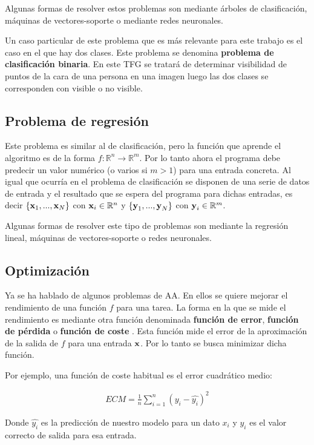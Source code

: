 Algunas formas de resolver estos problemas son mediante árboles de clasificación, máquinas de vectores-soporte o mediante redes neuronales.

Un caso particular de este problema que es más relevante para este trabajo es el caso en el que hay dos clases. Este problema se denomina \textbf{problema de clasificación binaria}. En este TFG se tratará de determinar visibilidad de puntos de la cara de una persona en una imagen luego las dos clases se corresponden con visible o no visible.

\subsection{Problema de regresión}
Este problema es similar al de clasificación, pero la función que aprende el algoritmo es de la forma $f:\mathbb{R}^n \rightarrow\mathbb{R}^m$. Por lo tanto ahora el programa debe predecir un valor numérico (o varios si $m > 1$) para una entrada concreta. Al igual que ocurría en el problema de clasificación se disponen de una serie de datos de entrada y el resultado que se espera del programa para dichas entradas, es decir $\{\textnormal{\textbf{x}}_1,...,\textnormal{\textbf{x}}_N\}$ con $\textnormal{\textbf{x}}_i\in\mathbb{R}^n$ y  $\{\textnormal{\textbf{y}}_1,...,\textnormal{\textbf{y}}_N\}$ con $\textnormal{\textbf{y}}_i \in \mathbb{R}^m$. 

Algunas formas de resolver este tipo de problemas son mediante la regresión lineal, máquinas de vectores-soporte o redes neuronales.

\subsection{Optimización} \label{optimización}

Ya se ha hablado de algunos problemas de AA. En ellos se quiere mejorar el rendimiento de una función $f$ para una tarea. La forma en la que se mide el rendimiento es mediante otra función denominada \textbf{función de error}, \textbf{función de pérdida} o \textbf{función de coste} \cite{Goodfellow-et-al-2016}. Esta función mide el error de la aproximación de la salida de $f$ para una entrada $\textnormal{\textbf{x}}$. Por lo tanto se busca minimizar dicha función.

Por ejemplo, una función de coste habitual es el error cuadrático medio:

\begin{align*}
ECM = \frac{1}{n}\sum_{i=1}^{n}(y_i-\hat{y_i})^2
\end{align*} 

Donde $\hat{y_i}$ es la predicción de nuestro modelo para un dato $x_i$ y $y_i$ es el valor correcto de salida para esa entrada.

